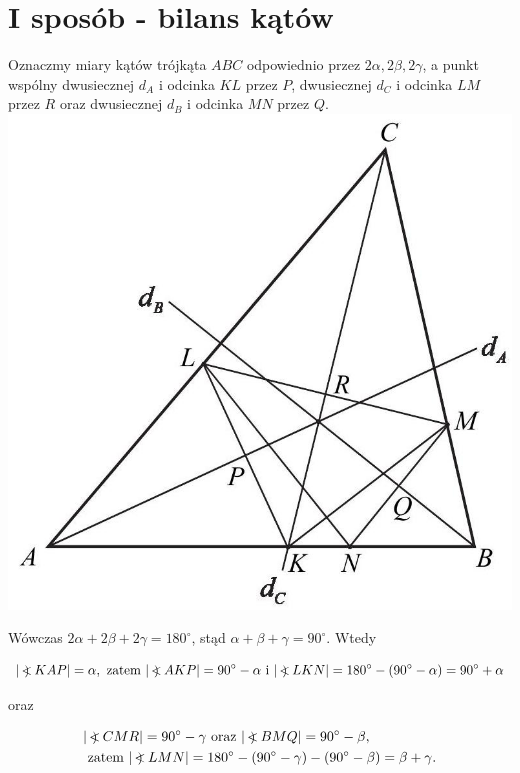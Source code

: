 \documentclass[10pt]{article}
\newcommand\Varangle{\mathop{{<\!\!\!\!\!\text{\small)}}\:}\nolimits}
\begin{document}
\section*{I sposób - bilans kątów}
Oznaczmy miary kątów trójkąta $A B C$ odpowiednio przez $2 \alpha, 2 \beta, 2 \gamma$, a punkt wspólny dwusiecznej $d_{A}$ i odcinka $K L$ przez $P$, dwusiecznej $d_{C}$ i odcinka $L M$ przez $R$ oraz dwusiecznej $d_{B}$ i odcinka $M N$ przez $Q$.\\
\includegraphics[max width=\textwidth, center]{2025_02_07_a13180f11f288af0ed0dg-05}

Wówczas $2 \alpha+2 \beta+2 \gamma=180^{\circ}$, stąd $\alpha+\beta+\gamma=90^{\circ}$. Wtedy

$$
|\Varangle K A P|=\alpha, \text { zatem }|\Varangle A K P|=90^{\circ}-\alpha \text { i }|\Varangle L K N|=180^{\circ}-\left(90^{\circ}-\alpha\right)=90^{\circ}+\alpha
$$

oraz

$$
\begin{aligned}
& |\Varangle C M R|=90^{\circ}-\gamma \text { oraz }|\Varangle B M Q|=90^{\circ}-\beta, \\
& \text { zatem }|\Varangle L M N|=180^{\circ}-\left(90^{\circ}-\gamma\right)-\left(90^{\circ}-\beta\right)=\beta+\gamma .
\end{aligned}
$$
\end{document}
